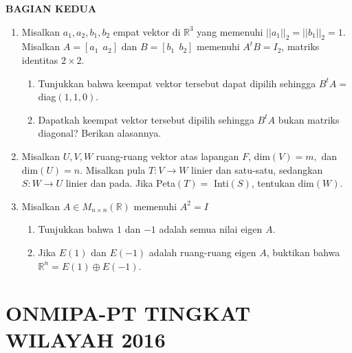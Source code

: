 \documentclass[12pt,twoside]{article}
\begin{document}
\newpage \textbf{BAGIAN KEDUA}
\begin{enumerate}
	\item Misalkan $a_1,a_2,b_1,b_2$ empat vektor di $\mathbb{R}^3$ yang memenuhi $||a_1||_2 = ||b_1||_2=1$. Misalkan $A = \left[a_1~~a_2\right]$ dan $B = \left[ b_1 ~~ b_2 \right]$ memenuhi $A^tB = I_2$, matriks identitas $2 \times 2$.
	      \begin{enumerate}
		      \item Tunjukkan bahwa keempat vektor tersebut dapat dipilih sehingga $B^tA=$ diag$(1,1,0)$.
		      \item Dapatkah keempat vektor tersebut dipilih sehingga $B^tA$ bukan matriks diagonal? Berikan alasannya.
	      \end{enumerate}

	\item Misalkan $U,V,W$ ruang-ruang vektor atas lapangan $F$, dim$(V)=m,$ dan dim$(U)=n.$ Misalkan pula $T : V \to W$ linier dan satu-satu, sedangkan $S : W \to U$ linier dan pada. Jika Peta$(T)=$ Inti$(S)$, tentukan dim$(W)$.

	\item Misalkan $A \in M_{n \times n}(\mathbb{R})$ memenuhi $A^2 = I$
	      \begin{enumerate}
		      \item Tunjukkan bahwa $1$ dan $-1$ adalah semua nilai eigen $A$.
		      \item Jika $E(1)$ dan $E(-1)$ adalah ruang-ruang eigen $A$, buktikan bahwa $\mathbb{R}^n = E(1) \oplus E(-1)$.
	      \end{enumerate}

\end{enumerate}

\newpage
{}
\section{ONMIPA-PT TINGKAT WILAYAH 2016}
\end{document}
